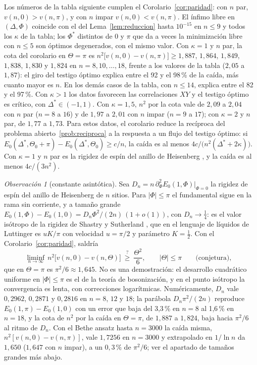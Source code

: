 \documentclass[11pt,a4paper]{article}
\theoremstyle{remark}
\newtheorem*{observacion}{Observación}
\begin{document}
Los números de la tabla siguiente cumplen el Corolario~\ref{cor:paridad}: con $n$ par,
$v(n,0)>v(n,\pi)$, y con $n$ impar $v(n,0)<v(n,\pi)$. El ínfimo libre en $(\Delta,\Phi)$ coincide
con el del Lema~\ref{lem:reduccion} hasta $10^{-15}$ en $n\le9$ y todos los $\kappa$ de la tabla;
los $\Phi^\ast$ distintos de $0$ y $\pi$ que da a veces la minimización libre con $n\le5$ son óptimos
degenerados, con el mismo valor. Con $\kappa=1$ y $n$ par, la cota del corolario en $\Theta=\pi$ es
$n^2\big[v(n,0)-v(n,\pi)\big]\ge1{,}887$, $1{,}864$, $1{,}849$, $1{,}838$, $1{,}830$ y $1{,}824$ en
$n=8,10,\dots,18$, frente a los valores de la tabla ($2{,}05$ a $1{,}87$): el giro del testigo
óptimo explica entre el 92 y el 98\,\% de la caída, más cuanto mayor es $n$. En los demás casos de la
tabla, con $n\le14$, explica entre el 82 y el 97\,\%. Con $\kappa>1$ los datos favorecen las
correlaciones $XY$ y el testigo óptimo es crítico, con $\Delta^\ast\in(-1,1)$. Con $\kappa=1{,}5$,
$n^2$ por la cota vale de $2{,}09$ a $2{,}04$ con $n$ par ($n=8$ a $16$) y de $1{,}97$ a $2{,}01$ con
$n$ impar ($n=9$ a $17$); con $\kappa=2$ y $n$ par, de $1{,}77$ a $1{,}73$. Para estos datos, el
corolario reduce la recíproca del problema abierto~\ref{prob:reciproca} a la respuesta a un flujo del testigo óptimo:
si $E_0(\Delta^\ast,\Theta_0+\pi)-E_0(\Delta^\ast,\Theta_0)\ge c/n$, la caída es al menos
$4c/\big(n^2(\Delta^\ast+2\kappa)\big)$. Con $\kappa=1$ y $n$ par es la rigidez de espín del anillo
de Heisenberg \cite{shastry}, y la caída es al menos $4c/(3n^2)$.

\begin{observacion}[constante asintótica]
Sea $D_n=n\,\partial_\Phi^2E_0(1,\Phi)|_{\Phi=0}$ la rigidez de espín del anillo de Heisenberg de $n$
sitios. Para $|\Phi|\le\pi$ el fundamental sigue en la rama sin corriente, y a tamaño grande
$E_0(1,\Phi)-E_0(1,0)=D_n\Phi^2/(2n)\,(1+o(1))$, con $D_n\to\tfrac14$: es el valor isótropo de la
rigidez de Shastry y Sutherland \cite{shastry}, que en el lenguaje de líquidos de Luttinger es
$uK/\pi$ con velocidad $u=\pi/2$ y parámetro $K=\tfrac12$. Con el Corolario~\ref{cor:paridad},
saldría
\[
  \liminf_{n\to\infty}\,n^2\big[v(n,0)-v(n,\Theta)\big]\ \overset{?}{\ge}\ \frac{\Theta^2}6,\qquad|\Theta|\le\pi
  \qquad\text{(conjetura)},
\]
que en $\Theta=\pi$ es $\pi^2/6\approx1{,}645$. No es una demostración: el desarrollo cuadrático
uniforme en $|\Phi|\le\pi$ es el de la teoría de bosonización, y en el punto isótropo la convergencia
es lenta, con correcciones logarítmicas. Numéricamente, $D_n$ vale $0{,}2962$, $0{,}2871$ y
$0{,}2816$ en $n=8$, $12$ y $18$; la parábola $D_n\pi^2/(2n)$ reproduce $E_0(1,\pi)-E_0(1,0)$ con un
error que baja del 3,3\,\% en $n=8$ al 1,6\,\% en $n=18$, y la cota de $n^2$ por la caída en $\Theta=\pi$, de $1{,}887$ a $1{,}824$, baja
hacia $\pi^2/6$ al ritmo de $D_n$. Con el Bethe ansatz hasta $n=3000$ la caída misma,
$n^2[v(n,0)-v(n,\pi)]$, vale $1{,}7256$ en $n=3000$ y extrapolado en $1/\ln n$ da $1{,}650$
($1{,}647$ con $n$ impar), a un $0{,}3$\,\% de $\pi^2/6$; ver el apartado de tamaños grandes más
abajo.
\end{observacion}
\end{document}
